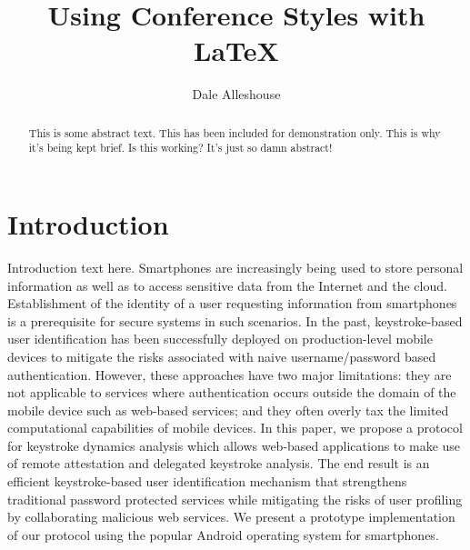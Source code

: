 \documentclass[twocolumn]{article}
\begin{document}
\title{Using Conference Styles with \LaTeX}
\author{Dale Alleshouse}
\maketitle

\begin{abstract} 
This is some abstract text. This has been included for demonstration only. This is why it's being
kept brief. Is this working? It's just so damn abstract!
\end{abstract} 


\section{Introduction}
Introduction text here. Smartphones are increasingly being used to store personal information as
well as to access sensitive data from the Internet and the cloud. Establishment of the identity of a
user requesting information from smartphones is a prerequisite for  secure systems in such
scenarios. In the past, keystroke-based user identification has been successfully deployed on
production-level mobile devices to mitigate the risks associated with naive username/password based
authentication. However, these approaches have two major limitations: they are not applicable to
services where authentication occurs outside the domain of the mobile device such as web-based
services; and they often overly tax the limited computational capabilities of mobile devices. In
this paper, we propose a protocol for keystroke dynamics analysis which allows web-based
applications to make use of remote attestation and delegated keystroke analysis. The end result is
an efficient keystroke-based user identification mechanism that strengthens traditional password
protected services while mitigating the risks of user profiling by collaborating malicious web
services. We present a prototype implementation of our protocol using the popular Android operating
system for smartphones.
\end{document}
